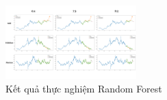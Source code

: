 \begin{figure}[H]
\centerline{\includegraphics[width=0.45\textwidth]{img/RF_result.png}}
\caption{Kết quả thực nghiệm Random Forest}
\label{fig}
\end{figure}